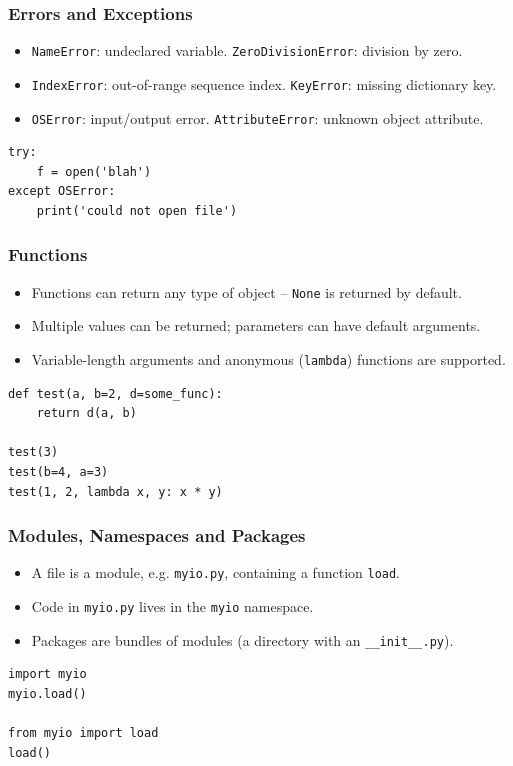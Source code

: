 \begin{frame}[fragile]\frametitle{Errors and Exceptions}
	\begin{itemize}
	\item \texttt{NameError}: undeclared variable. \texttt{ZeroDivisionError}: division by zero.
	\item \texttt{IndexError}: out-of-range sequence index. \texttt{KeyError}: missing dictionary key.
	\item \texttt{OSError}: input/output error. \texttt{AttributeError}: unknown object attribute.
	\end{itemize}
\begin{lstlisting}
try:
    f = open('blah')
except OSError:
    print('could not open file')
\end{lstlisting}
\end{frame}

\begin{frame}[fragile]\frametitle{Functions}
	\begin{itemize}
	\item Functions can return any type of object -- \lstinline{None} is returned by default.
	\item Multiple values can be returned; parameters can have default arguments.
	\item Variable-length arguments and anonymous (\lstinline{lambda}) functions are supported.
	\end{itemize}
\begin{lstlisting}
def test(a, b=2, d=some_func):
    return d(a, b)

test(3)
test(b=4, a=3)
test(1, 2, lambda x, y: x * y)
\end{lstlisting}
\end{frame}

\begin{frame}[fragile]\frametitle{Modules, Namespaces and Packages}
	\begin{itemize}
	\item A file is a module, e.g. \texttt{myio.py}, containing a function \texttt{load}.
	\item Code in \texttt{myio.py} lives in the \texttt{myio} namespace.
	\item Packages are bundles of modules (a directory with an \texttt{\_\_init\_\_.py}).
	\end{itemize}
\begin{lstlisting}
import myio
myio.load()

from myio import load
load()
\end{lstlisting}
\end{frame}

